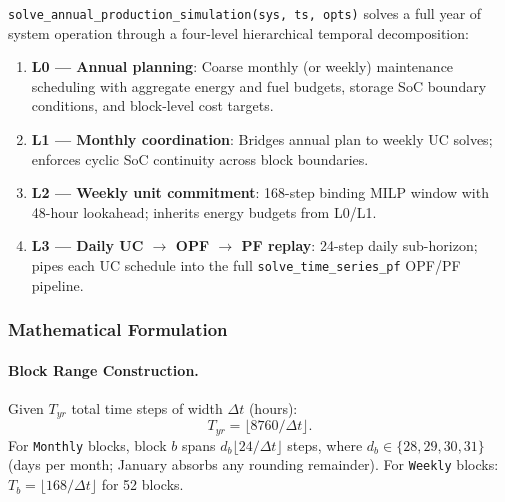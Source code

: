 \texttt{solve\_annual\_production\_simulation(sys, ts, opts)} solves a full
year of system operation through a four-level hierarchical temporal
decomposition:

\begin{enumerate}
  \item \textbf{L0 --- Annual planning}: Coarse monthly (or weekly)
        maintenance scheduling with aggregate energy and fuel budgets, storage
        SoC boundary conditions, and block-level cost targets.
  \item \textbf{L1 --- Monthly coordination}: Bridges annual plan to weekly
        UC solves; enforces cyclic SoC continuity across block boundaries.
  \item \textbf{L2 --- Weekly unit commitment}: 168-step binding MILP window
        with 48-hour lookahead; inherits energy budgets from L0/L1.
  \item \textbf{L3 --- Daily UC $\to$ OPF $\to$ PF replay}: 24-step daily
        sub-horizon; pipes each UC schedule into the full
        \texttt{solve\_time\_series\_pf} OPF/PF pipeline.
\end{enumerate}

\subsubsection{Mathematical Formulation}

\paragraph{Block Range Construction.}
Given $T_{yr}$ total time steps of width $\Delta t$ (hours):
\begin{equation}
  T_{yr} = \lfloor 8760 / \Delta t \rfloor.
\end{equation}
For \texttt{Monthly} blocks, block $b$ spans $d_b\lfloor 24/\Delta t\rfloor$
steps, where $d_b \in \{28,29,30,31\}$ (days per month; January absorbs
any rounding remainder).  For \texttt{Weekly} blocks:
$T_b = \lfloor 168/\Delta t\rfloor$ for 52 blocks.

